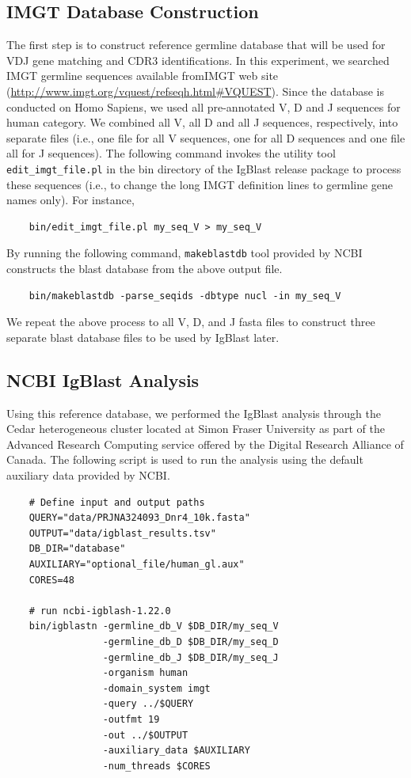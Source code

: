 \documentclass{article}
\begin{document}
\subsection{IMGT Database Construction}
The first step is to construct reference germline database that will be used for VDJ gene matching and CDR3 identifications. In this experiment, we searched IMGT germline sequences available fromIMGT web site (\url{http://www.imgt.org/vquest/refseqh.html#VQUEST}). Since the database is conducted on Homo Sapiens, we used all pre-annotated V, D and J sequences for human category. We combined all V, all D and all J sequences, respectively, into separate files (i.e., one file for all V sequences, one for all D sequences and one file all for J sequences). The following command invokes the utility tool \texttt{edit\_imgt\_file.pl} in the bin directory of the IgBlast release package to process these sequences (i.e., to change the long IMGT definition lines to germline gene names only). For instance,
\begin{verbatim}
    bin/edit_imgt_file.pl my_seq_V > my_seq_V
\end{verbatim}
By running the following command, \texttt{makeblastdb} tool provided by NCBI constructs the blast database from the above output file.
\begin{verbatim}
    bin/makeblastdb -parse_seqids -dbtype nucl -in my_seq_V
\end{verbatim}
We repeat the above process to all V, D, and J fasta files to construct three separate blast database files to be used by IgBlast later.

\subsection{NCBI IgBlast Analysis}
Using this reference database, we performed the IgBlast analysis through the Cedar heterogeneous cluster located at Simon Fraser University as part of the Advanced Research Computing service offered by the Digital Research Alliance of Canada. The following script is used to run the analysis using the default auxiliary data provided by NCBI.
\begin{verbatim}
    # Define input and output paths
    QUERY="data/PRJNA324093_Dnr4_10k.fasta"
    OUTPUT="data/igblast_results.tsv"
    DB_DIR="database"
    AUXILIARY="optional_file/human_gl.aux"
    CORES=48
    
    # run ncbi-igblash-1.22.0
    bin/igblastn -germline_db_V $DB_DIR/my_seq_V
                 -germline_db_D $DB_DIR/my_seq_D
                 -germline_db_J $DB_DIR/my_seq_J
                 -organism human
                 -domain_system imgt
                 -query ../$QUERY
                 -outfmt 19
                 -out ../$OUTPUT
                 -auxiliary_data $AUXILIARY
                 -num_threads $CORES
\end{verbatim}
\end{document}
